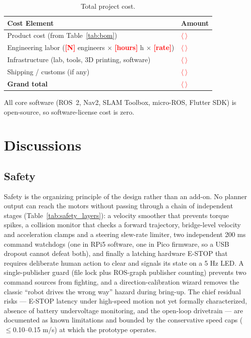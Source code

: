 \documentclass[12pt,a4paper]{report}
\newcommand{\TODO}[1]{\textcolor{red}{\textbf{[#1]}}}
\newcommand{\fillin}{\textcolor{red}{$\langle\ \rangle$}}
\begin{document}
\begin{table}[H]
\centering
\caption{Total project cost.}
\label{tab:total_cost}
\begin{tabularx}{\textwidth}{|X|p{3.4cm}|}
\hline
\textbf{Cost Element} & \textbf{Amount} \\
\hline
Product cost (from Table~\ref{tab:bom}) & \fillin \\
\hline
Engineering labor (\TODO{N} engineers $\times$ \TODO{hours} h $\times$ \TODO{rate}) & \fillin \\
\hline
Infrastructure (lab, tools, 3D printing, software) & \fillin \\
\hline
Shipping / customs (if any) & \fillin \\
\hline
\textbf{Grand total} & \fillin \\
\hline
\end{tabularx}
\end{table}

\noindent All core software (ROS~2, Nav2, SLAM Toolbox, micro-ROS, Flutter SDK)
is open-source, so software-license cost is zero.

\chapter{Discussions}
\label{ch:discussion}

\section{Safety}

Safety is the organizing principle of the design rather than an add-on. No planner
output can reach the motors without passing through a chain of independent stages
(Table~\ref{tab:safety_layers}): a velocity smoother that prevents torque spikes,
a collision monitor that checks a forward trajectory, bridge-level velocity and
acceleration clamps and a steering slew-rate limiter, two independent 200 ms
command watchdogs (one in RPi5 software, one in Pico firmware, so a USB dropout
cannot defeat both), and finally a latching hardware E-STOP that requires
deliberate human action to clear and signals its state on a 5 Hz LED. A
single-publisher guard (file lock plus ROS-graph publisher counting) prevents two
command sources from fighting, and a direction-calibration wizard removes the
classic ``robot drives the wrong way'' hazard during bring-up. The chief residual
risks --- E-STOP latency under high-speed motion not yet formally characterized,
absence of battery undervoltage monitoring, and the open-loop drivetrain --- are
documented as known limitations and bounded by the conservative speed caps
($\leq$0.10--0.15 m/s) at which the prototype operates.
\end{document}
